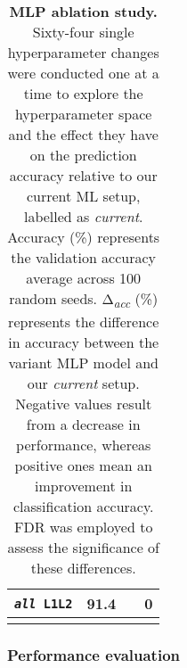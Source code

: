 \begin{longtable}{|c|c|c|c|}
\texttt{\textit{all} L1L2}          & 91.4              &  \textminus2.5                   & 0            \\ \hline
\caption[MLP ablation study]{\textbf{MLP ablation study.} Sixty-four single hyperparameter changes were conducted one at a time to explore the hyperparameter space and the effect they have on the prediction accuracy relative to our current ML setup, labelled as \textit{current}. Accuracy (\%) represents the validation accuracy average across 100 random seeds. Δ\textsubscript{\textit{acc}} (\%) represents the difference in accuracy between the variant MLP model and our \textit{current} setup. Negative values result from a decrease in performance, whereas positive ones mean an improvement in classification accuracy. FDR was employed to assess the significance of these differences.}
\label{tab:MLP_ablation}
\end{longtable}





\subsubsection{Performance evaluation}

